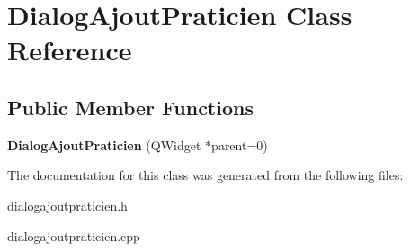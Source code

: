 \hypertarget{classDialogAjoutPraticien}{\section{Dialog\-Ajout\-Praticien Class Reference}
\label{classDialogAjoutPraticien}
}
\subsection*{Public Member Functions}
\begin{DoxyCompactItemize}
\item 
\hypertarget{classDialogAjoutPraticien_a92e3f7a1059f169e3b88d9fb33b008fc}{{\bfseries Dialog\-Ajout\-Praticien} (Q\-Widget $\ast$parent=0)}\label{classDialogAjoutPraticien_a92e3f7a1059f169e3b88d9fb33b008fc}

\end{DoxyCompactItemize}


The documentation for this class was generated from the following files\-:\begin{DoxyCompactItemize}
\item 
dialogajoutpraticien.\-h\item 
dialogajoutpraticien.\-cpp\end{DoxyCompactItemize}
